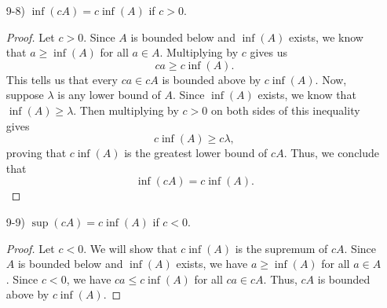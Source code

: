 \documentclass[11pt,a4paper]{article}
\begin{document}
\begin{enumerate}
\begin{enumerate}
\begin{proof}
               Now, let \( \gamma  \) be any upper bound of \( A   \). Since \( \sup(A) \) exists, we know that \( \sup(A) \leq \gamma \). By multiplying by \( c > 0  \), we have  
               \[  c \sup(A) \leq c \gamma. \]
               But \( c \gamma  \) is an upper bound of \( cA \), so \( c \sup(A) \) must be the least upper bound of \( cA \). Thus, we have that \( c \sup(A) \) is the supremum of \( cA \) and that \( \sup(cA) = c \sup(A) \).
               \end{proof} 
        \item[9-8)] \( \inf(cA) = c \inf (A)  \) if \( c > 0  \).
            \begin{proof}
            Let \( c > 0  \). Since \( A  \) is bounded below and \( \inf(A) \) exists, we know that \( a \geq \inf(A) \) for all \( a \in A  \). Multiplying by \( c  \) gives us
            \[  ca \geq c \inf(A). \]
            This tells us that every \( ca \in cA  \) is bounded above by \( c \inf(A) \). Now, suppose \( \lambda  \) is any lower bound of \( A  \). Since \( \inf(A)  \) exists, we know that \( \inf(A) \geq \lambda  \). Then multiplying by \( c > 0 \) on both sides of this inequality gives  
            \[  c \inf(A) \geq c \lambda,  \]
proving that \( c \inf(A) \) is the greatest lower bound of \( cA  \). Thus, we conclude that
\[  \inf(cA) = c \inf(A). \]
            \end{proof}
        \item[9-9)] \( \sup(cA) = c \inf(A) \) if \( c < 0  \).
            \begin{proof}
            Let \( c < 0  \). We will show that \( c \inf(A)  \) is the supremum of \( cA \). Since \( A  \) is bounded below and \( \inf(A) \) exists, we have \( a \geq \inf(A) \) for all \( a \in A  \). Since \( c < 0  \), we have \( ca \leq c \inf(A) \) for all \( ca \in cA  \). Thus, \( cA  \) is bounded above by \( c \inf(A) \). 


\end{proof}
\end{enumerate}
\end{enumerate}
\end{document}

